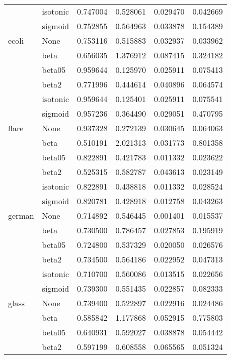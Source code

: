 \begin{tabular}{llrrrr}
        & isotonic &  0.747004 &   0.528061 &  0.029470 &  0.042669 \\
        & sigmoid &  0.752855 &   0.564963 &  0.033878 &  0.154389 \\
ecoli & None &  0.753116 &   0.515883 &  0.032937 &  0.033962 \\
        & beta &  0.656035 &   1.376912 &  0.087415 &  0.324182 \\
        & beta05 &  0.959644 &   0.125970 &  0.025911 &  0.075413 \\
        & beta2 &  0.771996 &   0.444614 &  0.040896 &  0.064574 \\
        & isotonic &  0.959644 &   0.125401 &  0.025911 &  0.075541 \\
        & sigmoid &  0.957236 &   0.364490 &  0.029051 &  0.470795 \\
flare & None &  0.937328 &   0.272139 &  0.030645 &  0.064063 \\
        & beta &  0.510191 &   2.021313 &  0.031773 &  0.801358 \\
        & beta05 &  0.822891 &   0.421783 &  0.011332 &  0.023622 \\
        & beta2 &  0.525315 &   0.582787 &  0.043613 &  0.023149 \\
        & isotonic &  0.822891 &   0.438818 &  0.011332 &  0.028524 \\
        & sigmoid &  0.820781 &   0.428918 &  0.012758 &  0.043263 \\
german & None &  0.714892 &   0.546445 &  0.001401 &  0.015537 \\
        & beta &  0.730500 &   0.786457 &  0.027853 &  0.195919 \\
        & beta05 &  0.724800 &   0.537329 &  0.020050 &  0.026576 \\
        & beta2 &  0.734500 &   0.564186 &  0.022952 &  0.047313 \\
        & isotonic &  0.710700 &   0.560086 &  0.013515 &  0.022656 \\
        & sigmoid &  0.739300 &   0.551435 &  0.022857 &  0.082333 \\
glass & None &  0.739400 &   0.522897 &  0.022916 &  0.024486 \\
        & beta &  0.585842 &   1.177868 &  0.052915 &  0.775803 \\
        & beta05 &  0.640931 &   0.592027 &  0.038878 &  0.054442 \\
        & beta2 &  0.597199 &   0.608558 &  0.065565 &  0.051324 \\

\end{tabular}
